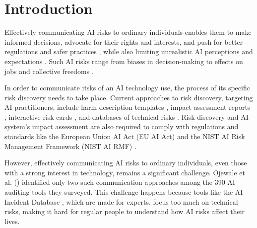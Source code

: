 \section{Introduction}

Effectively communicating AI risks to ordinary individuals enables them to make informed decisions, advocate for their rights and interests, and push for better regulations and safer practices \cite{bao2022whose}, while also limiting unrealistic AI perceptions and expectations \cite{nourani2020role, neri2020role}. Such AI risks range from biases in decision-making to effects on jobs and collective freedoms  \cite{mcgregor2021preventing}. 

In order to communicate risks of an AI technology use, the process of its specific risk discovery needs to take place. Current approaches to risk discovery, targeting AI practitioners, include harm description templates \cite{buccinca2023aha}, impact assessment reports \cite{microsoft2022Assessment, stahl2023systematicReview}, interactive risk cards \cite{constantinides2023prompts}, and databases of technical risks \cite{IBMriskAtlas, AIRiskDatabase}. Risk discovery and AI system's impact assessment are also required to comply with regulations and standards like the European Union AI Act (EU AI Act) \cite{EUACT2024} and the NIST AI Risk Management Framework (NIST AI RMF) \cite{nist2023aiRisk}.

However, effectively communicating AI risks to ordinary individuals, even those with a strong interest in technology, remains a significant challenge. Ojewale et al. (\citeyear{ojewale2024towards}) identified only two  such communication approaches among the 390 AI auditing tools they surveyed. This challenge happens because tools like the AI Incident Database \cite{spatialDatabaseView}, which are made for experts, focus too much on technical risks, making it hard for regular people to understand how AI risks affect their lives.

